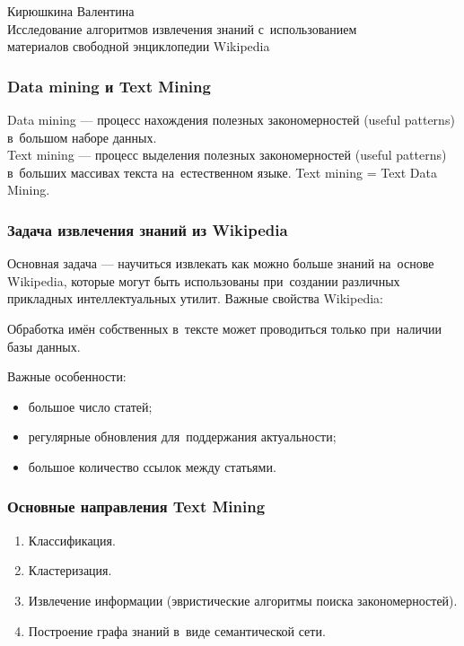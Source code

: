 \documentclass{beamer}
\begin{document}
\begin{frame}
\begin{center}
Кирюшкина Валентина \\
\vspace{1cm}
{\Large Исследование алгоритмов извлечения знаний с~использованием\\ 
материалов свободной энциклопедии Wikipedia}\\ 
\end{center}
\end{frame}

\begin{frame}
\frametitle{Data mining и Text Mining}
Data mining --- процесс нахождения полезных закономерностей (useful patterns)  в~большом наборе данных.\\
\vspace{1cm}
Text mining --- процесс выделения полезных закономерностей (useful patterns) 
в~больших массивах текста на~естественном языке. 
Text mining = Text Data Mining.
\end{frame}

\begin{frame}
\frametitle{Задача извлечения знаний из Wikipedia}
Основная задача --- научиться извлекать как можно больше знаний на~основе Wikipedia,
которые могут быть использованы  при~создании различных прикладных интеллектуальных утилит.
Важные свойства Wikipedia:

\begin{enumerate}

\item {Одна статья --- одно понятие (сущность).
\item{Предоставляет материалы по именам собственным.}

\end{enumerate}

Обработка имён собственных в~тексте может проводиться только при~наличии базы данных.

\vspace{1cm}
Важные особенности:
\begin{itemize}
\item{большое число статей;}
\item{регулярные обновления для~поддержания актуальности;}
\item{большое количество ссылок между статьями.}
\end{itemize}

\end{frame}

\begin{frame}
\frametitle{Основные направления Text Mining}
\begin{enumerate}
\item{Классификация.}
\item{Кластеризация.}
\item{Извлечение информации (эвристические алгоритмы поиска закономерностей).}
\item{Построение графа знаний в~виде семантической сети.}

\end{enumerate}
\end{frame}
\end{document}
